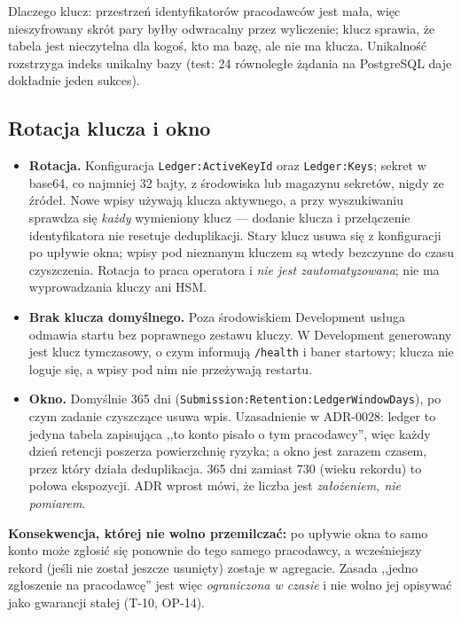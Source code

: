 Dlaczego klucz: przestrzeń identyfikatorów pracodawców jest mała, więc
nieszyfrowany skrót pary byłby odwracalny przez wyliczenie; klucz sprawia, że
tabela jest nieczytelna dla kogoś, kto ma bazę, ale nie ma klucza. Unikalność
rozstrzyga indeks unikalny bazy (test: 24 równoległe żądania na PostgreSQL daje
dokładnie jeden sukces).

\subsection{Rotacja klucza i okno}

\begin{itemize}[leftmargin=*]
    \item \textbf{Rotacja.} Konfiguracja \texttt{Ledger:ActiveKeyId} oraz
    \texttt{Ledger:Keys}; sekret w base64, co najmniej 32 bajty, z
    środowiska lub magazynu sekretów, nigdy ze źródeł. Nowe wpisy używają
    klucza aktywnego, a przy wyszukiwaniu sprawdza się \emph{każdy} wymieniony
    klucz --- dodanie klucza i przełączenie identyfikatora nie resetuje
    deduplikacji. Stary klucz usuwa się z konfiguracji po upływie okna; wpisy
    pod nieznanym kluczem są wtedy bezczynne do czasu czyszczenia. Rotacja to
    praca operatora i \emph{nie jest zautomatyzowana}; nie ma wyprowadzania kluczy ani HSM.
    \item \textbf{Brak klucza domyślnego.} Poza środowiskiem Development
    usługa odmawia startu bez poprawnego zestawu kluczy. W Development
    generowany jest klucz tymczasowy, o czym informują \texttt{/health} i
    baner startowy; klucza nie loguje się, a wpisy pod nim nie przeżywają restartu.
    \item \textbf{Okno.} Domyślnie 365 dni (\texttt{Submission:Retention:LedgerWindowDays}),
    po czym zadanie czyszczące usuwa wpis. Uzasadnienie w ADR-0028: ledger to
    jedyna tabela zapisująca ,,to konto pisało o tym pracodawcy'', więc każdy
    dzień retencji poszerza powierzchnię ryzyka; a okno jest zarazem czasem, przez
    który działa deduplikacja. 365 dni zamiast 730 (wieku rekordu) to połowa
    ekspozycji. ADR wprost mówi, że liczba jest \emph{założeniem, nie pomiarem}.
\end{itemize}

\textbf{Konsekwencja, której nie wolno przemilczać:} po upływie okna to samo
konto może zgłosić się ponownie do tego samego pracodawcy, a wcześniejszy rekord
(jeśli nie został jeszcze usunięty) zostaje w agregacie. Zasada ,,jedno
zgłoszenie na pracodawcę'' jest więc \emph{ograniczona w czasie} i nie wolno jej
opisywać jako gwarancji stałej (T-10, OP-14).

